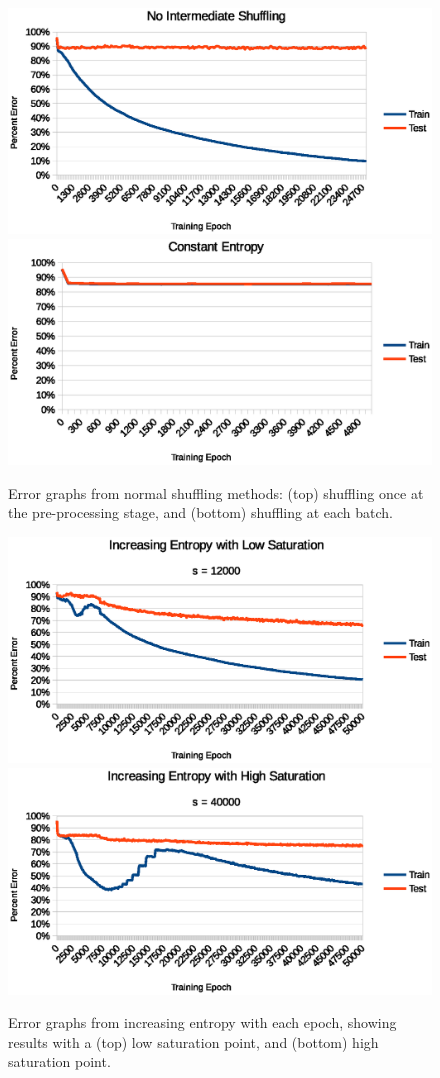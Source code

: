 \documentclass{article}
\begin{document}
\begin{figure}
\includegraphics[width=.5\textwidth]{No-Intermediate-Shuffling.eps}
\includegraphics[width=.5\textwidth]{Constant-Entropy.eps}
\caption{Error graphs from normal shuffling methods: (top) shuffling once at the pre-processing stage, and (bottom) shuffling at each batch.}
\label{fig:normalreg}
\end{figure}
\begin{figure}
\centering
\includegraphics[width=.75\textwidth]{Increasing-Entropy.eps}
\includegraphics[width=.75\textwidth]{High-Saturation.eps}
\caption{Error graphs from increasing entropy with each epoch, showing results with a (top) low saturation point, and (bottom) high saturation point.}
\label{fig:entropy}
\end{figure}
\end{document}
